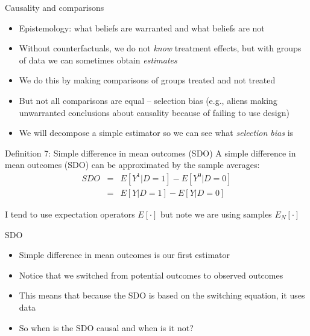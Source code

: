 \documentclass{beamer}
\begin{document}
\begin{frame}{Causality and comparisons}

  \begin{itemize}
    \item Epistemology: what beliefs are warranted and what beliefs are not
    \item Without counterfactuals, we do not \emph{know} treatment effects, but with groups of data we can sometimes obtain \emph{estimates}
    \item We do this by making comparisons of groups treated and not treated
    \item But not all comparisons are equal -- selection bias (e.g., aliens making unwarranted conclusions about causality because of failing to use design)
    \item We will decompose a simple estimator so we can see what \emph{selection bias} is
  \end{itemize}
\end{frame}



\begin{frame}[plain]


  \begin{block}{Definition 7: Simple difference in mean outcomes (SDO)}
    A simple difference in mean outcomes (SDO) can be approximated by the sample averages:\begin{eqnarray*}
      SDO &=& E[Y^1 | D=1] - E[Y^0 | D=0] \\
      &=& E[Y | D=1] - E[Y | D=0]
    \end{eqnarray*}
  \end{block}
  \bigskip
  I tend to use expectation operators $E[ \cdot ]$ but note we are using samples $E_N[ \cdot ]$

\end{frame}

\begin{frame}{SDO}

  \begin{itemize}
    \item Simple difference in mean outcomes is our first estimator
    \item Notice that we switched from potential outcomes to observed outcomes
    \item This means that because the SDO is based on the switching equation, it uses data
    \item So when is the SDO causal and when is it not?
  \end{itemize}

\end{frame}
\end{document}
